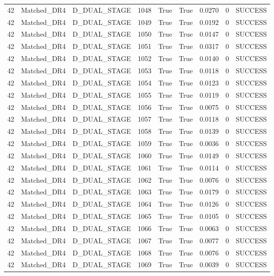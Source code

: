 \documentclass[11pt,a4paper,oneside]{book}
\begin{document}
\begin{longtable}{l l l l l l l l l}
42 & Matched\_DR4 & D\_DUAL\_STAGE & 1048 & True & True & 0.0270 & 0 & SUCCESS \\
42 & Matched\_DR4 & D\_DUAL\_STAGE & 1049 & True & True & 0.0192 & 0 & SUCCESS \\
42 & Matched\_DR4 & D\_DUAL\_STAGE & 1050 & True & True & 0.0147 & 0 & SUCCESS \\
42 & Matched\_DR4 & D\_DUAL\_STAGE & 1051 & True & True & 0.0317 & 0 & SUCCESS \\
42 & Matched\_DR4 & D\_DUAL\_STAGE & 1052 & True & True & 0.0140 & 0 & SUCCESS \\
42 & Matched\_DR4 & D\_DUAL\_STAGE & 1053 & True & True & 0.0118 & 0 & SUCCESS \\
42 & Matched\_DR4 & D\_DUAL\_STAGE & 1054 & True & True & 0.0123 & 0 & SUCCESS \\
42 & Matched\_DR4 & D\_DUAL\_STAGE & 1055 & True & True & 0.0119 & 0 & SUCCESS \\
42 & Matched\_DR4 & D\_DUAL\_STAGE & 1056 & True & True & 0.0075 & 0 & SUCCESS \\
42 & Matched\_DR4 & D\_DUAL\_STAGE & 1057 & True & True & 0.0118 & 0 & SUCCESS \\
42 & Matched\_DR4 & D\_DUAL\_STAGE & 1058 & True & True & 0.0139 & 0 & SUCCESS \\
42 & Matched\_DR4 & D\_DUAL\_STAGE & 1059 & True & True & 0.0036 & 0 & SUCCESS \\
42 & Matched\_DR4 & D\_DUAL\_STAGE & 1060 & True & True & 0.0149 & 0 & SUCCESS \\
42 & Matched\_DR4 & D\_DUAL\_STAGE & 1061 & True & True & 0.0114 & 0 & SUCCESS \\
42 & Matched\_DR4 & D\_DUAL\_STAGE & 1062 & True & True & 0.0076 & 0 & SUCCESS \\
42 & Matched\_DR4 & D\_DUAL\_STAGE & 1063 & True & True & 0.0179 & 0 & SUCCESS \\
42 & Matched\_DR4 & D\_DUAL\_STAGE & 1064 & True & True & 0.0126 & 0 & SUCCESS \\
42 & Matched\_DR4 & D\_DUAL\_STAGE & 1065 & True & True & 0.0105 & 0 & SUCCESS \\
42 & Matched\_DR4 & D\_DUAL\_STAGE & 1066 & True & True & 0.0063 & 0 & SUCCESS \\
42 & Matched\_DR4 & D\_DUAL\_STAGE & 1067 & True & True & 0.0077 & 0 & SUCCESS \\
42 & Matched\_DR4 & D\_DUAL\_STAGE & 1068 & True & True & 0.0076 & 0 & SUCCESS \\
42 & Matched\_DR4 & D\_DUAL\_STAGE & 1069 & True & True & 0.0039 & 0 & SUCCESS \\

\end{longtable}
\end{document}
